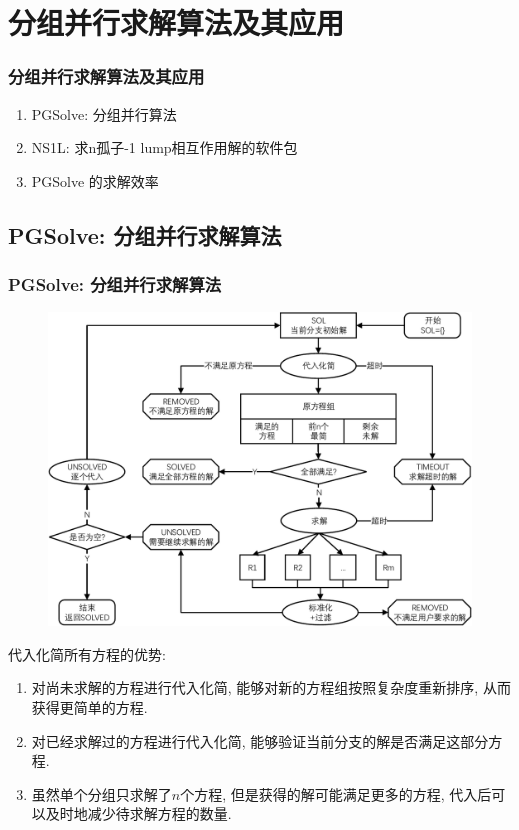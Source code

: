 \section{分组并行求解算法及其应用}
\begin{frame}
\frametitle{分组并行求解算法及其应用}
\begin{enumerate}
\item PGSolve: 分组并行算法
\item NS1L: 求n孤子-1 lump相互作用解的软件包
\item PGSolve 的求解效率
\end{enumerate}
\end{frame}

\subsection{PGSolve: 分组并行求解算法}
\begin{frame}
\frametitle{PGSolve: 分组并行求解算法}
\begin{figure}
\centering
\includegraphics[height=0.8\textheight]{../paper/fig/pgsolve.pdf}
\end{figure}
\end{frame}

\begin{frame}
代入化简所有方程的优势:
\begin{enumerate}
\item 对尚未求解的方程进行代入化简, 能够对新的方程组按照复杂度重新排序, 从而获得更简单的方程.
\item 对已经求解过的方程进行代入化简, 能够验证当前分支的解是否满足这部分方程. 
\item 虽然单个分组只求解了$n$个方程, 但是获得的解可能满足更多的方程, 代入后可以及时地减少待求解方程的数量. 
\end{enumerate}
\end{frame}

